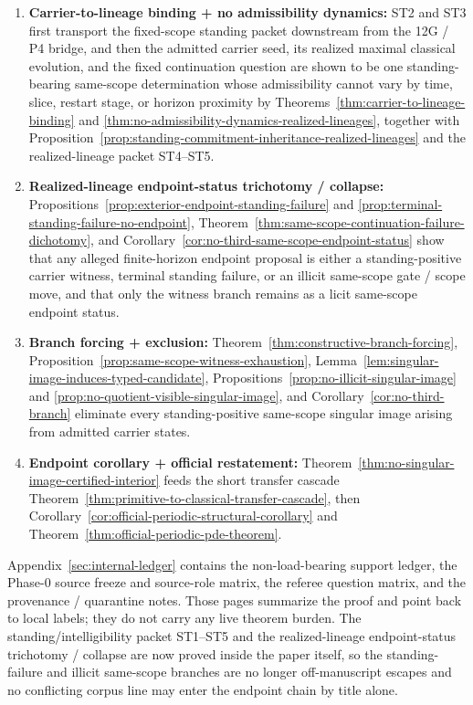 \begin{tcolorbox}[breakable, title={Compressed proof spine for the official theorem}, colback=blue!2!white, colframe=blue!55!black, boxsep=1pt, left=2pt, right=2pt, top=2pt, bottom=2pt]
\begin{enumerate}[label=(\roman*), leftmargin=2.2em, itemsep=0.15em, topsep=0.15em]
\item \textbf{Carrier-to-lineage binding + no admissibility dynamics:} ST2 and ST3 first transport the fixed-scope standing packet downstream from the 12G / P4 bridge, and then the admitted carrier seed, its realized maximal classical evolution, and the fixed continuation question are shown to be one standing-bearing same-scope determination whose admissibility cannot vary by time, slice, restart stage, or horizon proximity by Theorems~\ref{thm:carrier-to-lineage-binding} and \ref{thm:no-admissibility-dynamics-realized-lineages}, together with Proposition~\ref{prop:standing-commitment-inheritance-realized-lineages} and the realized-lineage packet ST4--ST5.
\item \textbf{Realized-lineage endpoint-status trichotomy / collapse:} Propositions~\ref{prop:exterior-endpoint-standing-failure} and \ref{prop:terminal-standing-failure-no-endpoint}, Theorem~\ref{thm:same-scope-continuation-failure-dichotomy}, and Corollary~\ref{cor:no-third-same-scope-endpoint-status} show that any alleged finite-horizon endpoint proposal is either a standing-positive carrier witness, terminal standing failure, or an illicit same-scope gate / scope move, and that only the witness branch remains as a licit same-scope endpoint status.
\item \textbf{Branch forcing + exclusion:} Theorem~\ref{thm:constructive-branch-forcing}, Proposition~\ref{prop:same-scope-witness-exhaustion}, Lemma~\ref{lem:singular-image-induces-typed-candidate}, Propositions~\ref{prop:no-illicit-singular-image} and \ref{prop:no-quotient-visible-singular-image}, and Corollary~\ref{cor:no-third-branch} eliminate every standing-positive same-scope singular image arising from admitted carrier states.
\item \textbf{Endpoint corollary + official restatement:} Theorem~\ref{thm:no-singular-image-certified-interior} feeds the short transfer cascade Theorem~\ref{thm:primitive-to-classical-transfer-cascade}, then Corollary~\ref{cor:official-periodic-structural-corollary} and Theorem~\ref{thm:official-periodic-pde-theorem}.
\end{enumerate}
Appendix~\ref{sec:internal-ledger} contains the non-load-bearing support ledger, the Phase-0 source freeze and source-role matrix, the referee question matrix, and the provenance / quarantine notes. Those pages summarize the proof and point back to local labels; they do not carry any live theorem burden. The standing/intelligibility packet ST1--ST5 and the realized-lineage endpoint-status trichotomy / collapse are now proved inside the paper itself, so the standing-failure and illicit same-scope branches are no longer off-manuscript escapes and no conflicting corpus line may enter the endpoint chain by title alone.
\end{tcolorbox}

